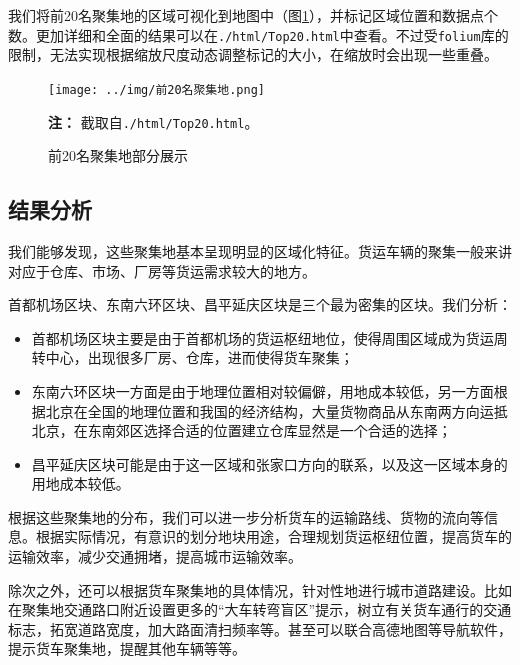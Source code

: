 \documentclass[UTF8]{ctexart}
\begin{document}
我们将前20名聚集地的区域可视化到地图中（图\ref{dense}），并标记区域位置和数据点个数。更加详细和全面的结果可以在\texttt{./html/Top20.html}中查看。不过受\texttt{folium}库的限制，无法实现根据缩放尺度动态调整标记的大小，在缩放时会出现一些重叠。

\begin{figure}[!htb]
    \centering
    \begin{minipage}{\textwidth}
        \centering
        \texttt{[image: ../img/前20名聚集地.png]}
        \caption{前20名聚集地部分展示}
        \label{dense}
    \end{minipage}
    \begin{minipage}{\textwidth}
        \footnotesize %
        \textbf{注：} 截取自\texttt{./html/Top20.html}。 %
    \end{minipage}
\end{figure}

\subsection{结果分析}

我们能够发现，这些聚集地基本呈现明显的区域化特征。货运车辆的聚集一般来讲对应于仓库、市场、厂房等货运需求较大的地方。

首都机场区块、东南六环区块、昌平延庆区块是三个最为密集的区块。我们分析：

\begin{itemize}[leftmargin=4em,itemsep=0pt,topsep=2pt]
    \item 首都机场区块主要是由于首都机场的货运枢纽地位，使得周围区域成为货运周转中心，出现很多厂房、仓库，进而使得货车聚集；
    \item 东南六环区块一方面是由于地理位置相对较偏僻，用地成本较低，另一方面根据北京在全国的地理位置和我国的经济结构，大量货物商品从东南两方向运抵北京，在东南郊区选择合适的位置建立仓库显然是一个合适的选择；
    \item 昌平延庆区块可能是由于这一区域和张家口方向的联系，以及这一区域本身的用地成本较低。
\end{itemize}

根据这些聚集地的分布，我们可以进一步分析货车的运输路线、货物的流向等信息。根据实际情况，有意识的划分地块用途，合理规划货运枢纽位置，提高货车的运输效率，减少交通拥堵，提高城市运输效率。

除次之外，还可以根据货车聚集地的具体情况，针对性地进行城市道路建设。比如在聚集地交通路口附近设置更多的“大车转弯盲区”提示，树立有关货车通行的交通标志，拓宽道路宽度，加大路面清扫频率等。甚至可以联合高德地图等导航软件，提示货车聚集地，提醒其他车辆等等。
\end{document}
